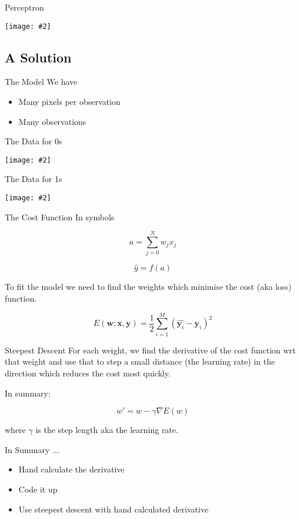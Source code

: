 \documentclass{beamer}
\newcommand {\framedgraphic}[2] {
    \begin{frame}{#1}
        \begin{center}
            \texttt{[image: \#2]}
        \end{center}
    \end{frame}
}
\begin{document}
\framedgraphic{Perceptron}{diagrams/Fita1.png}

\subsection{A Solution}

\begin{frame}[fragile]{The Model}
We have
\begin{itemize}
\item Many pixels per observation
\item Many observations
\end{itemize}
\end{frame}

\framedgraphic{The Data for 0s}{diagrams/mnist_train0.jpg}

\framedgraphic{The Data for 1s}{diagrams/mnist_train1.jpg}

\begin{frame}[fragile]{The Cost Function}
In symbols

$$
a = \sum_{j=0}^{N} w_{j} x_j
$$

$$
\hat{y} = f(a)
$$

To fit the model we need to find the weights which minimise the cost
(aka loss) function.

$$
E(\boldsymbol{w}; \boldsymbol{x}, \boldsymbol{y}) =
\frac{1}{2}\sum_{i=1}^M(\hat{\boldsymbol{y}_i} - \boldsymbol{y}_i)^2
$$
\end{frame}

\begin{frame}[fragile]{Steepest Descent}
For each weight, we find the derivative of the cost function wrt that
weight and use that to step a small distance (the learning rate) in
the direction which reduces the cost most quickly.

In summary:

$$
w' = w - \gamma\nabla E(w)
$$

where $\gamma$ is the step length aka the learning rate.
\end{frame}

\begin{frame}[fragile]{In Summary $\ldots$}
\begin{itemize}
\item Hand calculate the derivative
\item Code it up
\item Use steepest descent with hand calculated derivative
\end{itemize}
\end{frame}
\end{document}
